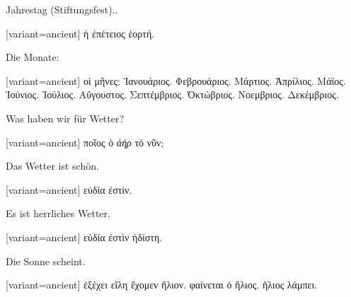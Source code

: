 Jahres\textcompwordmark{}tag (Stiftungs\textcompwordmark{}fest)..

\switchcolumn

\begin{greek}[variant=ancient]%
ἡ ἐπέτειος ἑορτή.

\end{greek}%
\switchcolumn*[\centering\rule{1.5in}{1pt}]

Die Monate:

\switchcolumn

\begin{greek}[variant=ancient]%
οἱ μῆνες: Ἰανουάριος. Φεβρουάριος. Μάρτιος. Ἀπρίλιος. Μάϊος. Ἰούνιος.
Ἰούλιος. Αὔγουστος. Σεπτέμβριος. Ὀκτώβριος. Νοεμβριος. Δεκέμβριος.

\end{greek}%
\indent Was haben wir für Wetter?

\switchcolumn

\begin{greek}[variant=ancient]%
ποῖος ὁ \emph{ἀὴρ} τό νῦν;

\end{greek}%
\switchcolumn*

Das Wetter ist schön.

\switchcolumn

\begin{greek}[variant=ancient]%
εὐδία ἐστίν.

\end{greek}%
\switchcolumn*

Es ist herrliches Wetter.

\switchcolumn

\begin{greek}[variant=ancient]%
εὐδία ἐστὶν ἡδίστη.

\end{greek}%
\switchcolumn*

Die Sonne scheint.

\switchcolumn

\begin{greek}[variant=ancient]%
ἐξέχει εἵλη ἔχομεν ἥλιον. φαίνεται ὁ ἥλιος. ἥλιος λάμπει.

\end{greek}%
\switchcolumn*

